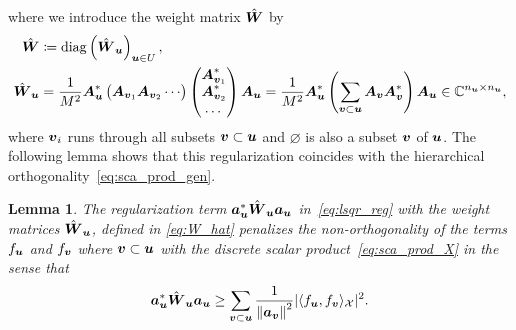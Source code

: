 \documentclass{article}
\renewcommand{\vec}[1]{\ensuremath \mathbf{\boldsymbol{#1}}}
\newcommand{\X}{\ensuremath{\mathcal{X}}}
\newcommand{\C}{\ensuremath{\mathbb{C}}}
\DeclareMathOperator*{\diag}{diag}
\newcommand{\norm}[1]{\left\lVert {#1} \right\rVert}    %
\newtheorem{lemma}[theorem]{Lemma}
\theoremstyle{definition}
\newenvironment{Lemma}{ \begin{lemma}\normalfont\slshape}{\end{lemma}}
\numberwithin{equation}{section}
\begin{document}
where we introduce the weight matrix $\hat{\vec W}$ by
\begin{align}\label{eq:W_hat}
\hat{\vec W} &\coloneqq \diag\left(\hat{\vec W}_{\vec u}\right)_{\vec u\in U},\notag\\
\hat{\vec W}_{\vec u} 
&= \frac{1}{M^2}\vec A_{\vec u}^* \begin{pmatrix}\vec A_{\vec v_1} \vec A_{\vec v_2}\cdots \end{pmatrix} \begin{pmatrix}\vec A^*_{\vec v_1}\\ \vec A^*_{\vec v_2}\\ \ldots\end{pmatrix}\vec A_\vec u 
= \frac{1}{M^2} \vec A_{\vec u}^* \left(\sum_{\vec v\subset \vec u} \vec A_{\vec v}\vec A_{\vec v}^* \right) \vec A_\vec u \in \C^{n_{\vec u} \times n_{\vec u}},
\end{align}
where $\vec v_i$ runs through all subsets $\vec v \subset \vec u$ and $\varnothing $ is also a subset $\vec v$ of $\vec u$.
The following lemma shows that this regularization coincides with the hierarchical orthogonality~\eqref{eq:sca_prod_gen}.
\begin{Lemma}\label{lem:lsqr_reg}
The regularization term $\vec a_{\vec u}^*\hat{\vec W}_{\vec u}\vec a_{\vec u}$ in~\eqref{eq:lsqr_reg} with the weight matrices $\hat{\vec W}_{\vec u}$, defined in \eqref{eq:W_hat} penalizes the non-orthogonality of the
terms $f_{\vec u}$ and $f_{\vec v}$ where $\vec v\subset \vec u$ with the discrete scalar product~\eqref{eq:sca_prod_X} in the sense that
$$\vec a_{\vec u}^*\hat{\vec W}_{\vec u} \vec a_{\vec u} \geq \sum_{\vec v\subset \vec u} \frac{1}{\norm{\vec a_{\vec v}}^2}|\langle f_{\vec u},f_{\vec v}\rangle_{\X} |^2.$$
 \end{Lemma}
\end{document}
